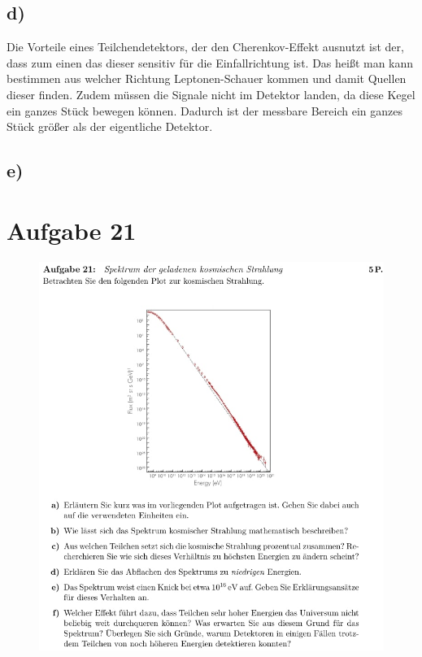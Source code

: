 \subsection{d)}
Die Vorteile eines Teilchendetektors, der den Cherenkov-Effekt ausnutzt ist der, dass
zum einen das dieser sensitiv für die Einfallrichtung ist. Das heißt man kann
bestimmen aus welcher Richtung Leptonen-Schauer kommen und damit Quellen dieser finden.
Zudem müssen die Signale nicht im Detektor landen, da diese Kegel ein ganzes Stück bewegen können. 
Dadurch ist der messbare Bereich ein ganzes Stück größer als der eigentliche Detektor.


\subsection{e)}



\section{Aufgabe 21}

    \begin{figure}[H]
        \centering
        \includegraphics[width=\textwidth]{images/Aufgabe21.jpg}
        \label{fig:4}
    \end{figure}


